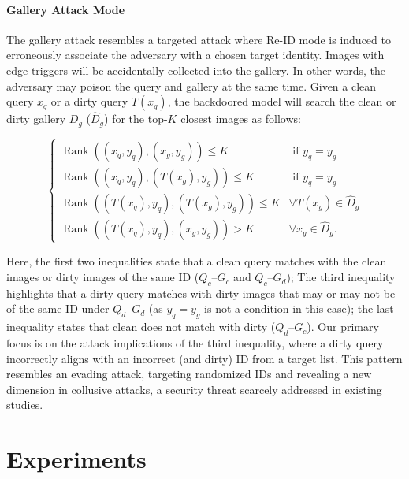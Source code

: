\documentclass[sigconf,authordraft]{acmart}
\begin{document}
\paragraph{Gallery Attack Mode} The gallery attack resembles a targeted attack where Re-ID mode is induced to erroneously associate the adversary with a chosen target identity. Images with edge triggers will be accidentally collected into the gallery. In other words, the adversary may poison the query and gallery at the same time. Given a clean query $x_q$ or a dirty query $T(x_q)$, the backdoored model will search the clean or dirty gallery ${D}_{g}$ ($\hat{D}_{g}$) for the top-$K$ closest images as follows:
\begin{small}
\begin{equation}
\begin{cases}
\operatorname{Rank}\left(\left(x_q, y_q\right),\left(x_g, y_g\right)\right) \leq K & \text { if } y_q= y_g \\ \operatorname{Rank}\left(\left(x_q, y_q\right),\left(T\left(x_g\right), y_g\right)\right) \leq K & \text { if } y_q = y_g \\ 
\operatorname{Rank}\left(\left(T\left(x_q\right), y_q\right),\left(T\left(x_g\right), y_g\right)\right) \leq K & \forall T\left(x_g\right) \in \hat{D}_g \\ \operatorname{Rank}\left(\left(T\left(x_q\right), y_q\right),\left(x_g, y_g\right)\right)>K & \forall x_g \in \hat{D}_g .\end{cases}
\end{equation}
\end{small}
Here, the first two inequalities state that a clean query matches with the clean images or dirty images of the same ID ($Q_{c}$--$G_{c}$ and $Q_{c}$--$G_{d}$); 
The third inequality highlights that a dirty query matches with dirty images that may or may not be of the same ID under $Q_{d}$--$G_{d}$ (as $y_q= y_g$ is not a condition in this case); the last inequality states that clean does not match with dirty ($Q_{d}$--$G_{c}$). 
Our primary focus is on the attack implications of the third inequality, where a dirty query incorrectly aligns with an incorrect (and dirty) ID from a target list. This pattern resembles an evading attack, targeting randomized IDs and revealing a new dimension in collusive attacks, a security threat scarcely addressed in existing studies.

\section{Experiments}
\label{sec:experiments}
\end{document}
